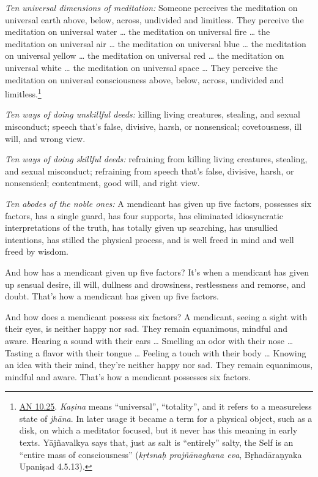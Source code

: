 \documentclass[12pt,openany]{book}%
\begin{document}
\emph{Ten universal dimensions of meditation:} Someone perceives the meditation on universal earth above, below, across, undivided and limitless. They perceive the meditation on universal water … the meditation on universal fire … the meditation on universal air … the meditation on universal blue … the meditation on universal yellow … the meditation on universal red … the meditation on universal white … the meditation on universal space … They perceive the meditation on universal consciousness above, below, across, undivided and limitless.\footnote{\href{https://suttacentral.net/an10.25/en/sujato}{AN 10.25}. \textit{\textsanskrit{Kaṣina}} means “universal”, “totality”, and it refers to a measureless state of \textit{\textsanskrit{jhāna}}. In later usage it became a term for a physical object, such as a disk, on which a meditator focused, but it never has this meaning in early texts. \textsanskrit{Yājñavalkya} says that, just as salt is “entirely” salty, the Self is an “entire mass of consciousness” (\textit{\textsanskrit{kṛtsnaḥ} \textsanskrit{prajñānaghana} eva}, \textsanskrit{Bṛhadāraṇyaka} \textsanskrit{Upaniṣad} 4.5.13). } 

\emph{Ten ways of doing unskillful deeds:} killing living creatures, stealing, and sexual misconduct; speech that’s false, divisive, harsh, or nonsensical; covetousness, ill will, and wrong view. 

\emph{Ten ways of doing skillful deeds:} refraining from killing living creatures, stealing, and sexual misconduct; refraining from speech that’s false, divisive, harsh, or nonsensical; contentment, good will, and right view. 

\emph{Ten abodes of the noble ones:} A mendicant has given up five factors, possesses six factors, has a single guard, has four supports, has eliminated idiosyncratic interpretations of the truth, has totally given up searching, has unsullied intentions, has stilled the physical process, and is well freed in mind and well freed by wisdom. 

And how has a mendicant given up five factors? It’s when a mendicant has given up sensual desire, ill will, dullness and drowsiness, restlessness and remorse, and doubt. That’s how a mendicant has given up five factors. 

And how does a mendicant possess six factors? A mendicant, seeing a sight with their eyes, is neither happy nor sad. They remain equanimous, mindful and aware. Hearing a sound with their ears … Smelling an odor with their nose … Tasting a flavor with their tongue … Feeling a touch with their body … Knowing an idea with their mind, they’re neither happy nor sad. They remain equanimous, mindful and aware. That’s how a mendicant possesses six factors. 
\end{document}
